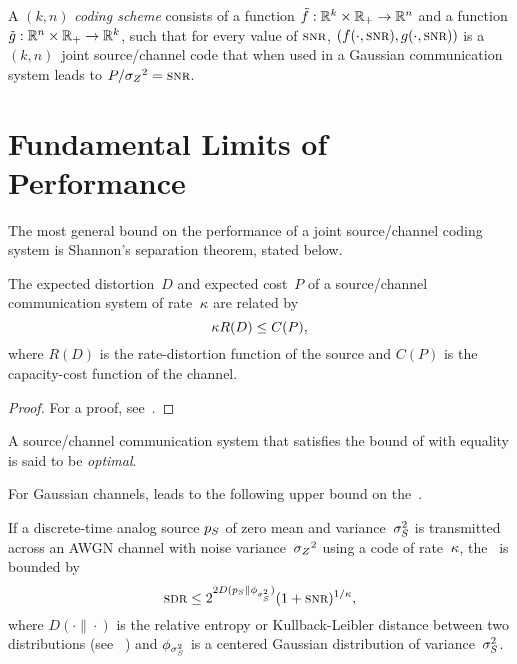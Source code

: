\begin{definition}
  \label{def:codingscheme}
  A $(k,n)$ \emph{coding scheme} consists of a function $\tilde{f} : \mathbb{R}^k \times
  \mathbb{R}_+ \rightarrow \mathbb{R}^n$ and a function $\tilde{g}: \mathbb{R}^n \times \mathbb{R}_+ \rightarrow \mathbb{R}^k$, such
  that for every value of $\snr$, $(f(\cdot, \snr), g(\cdot, \snr))$ is a
  $(k,n)$~joint source/channel code that when used in a Gaussian communication
  system leads to $P/\szq = \snr$.
\end{definition}


\section{Fundamental Limits of Performance}
\label{sec:limits}

The most general bound on the performance of a joint source/channel coding
system is Shannon's separation theorem, stated below.

\begin{theorem}
  \label{thm:sepconverse}
  The expected distortion~$D$ and expected cost~$P$ of a source/channel
  communication system of rate~$\kappa$ are related by
  \begin{equation}
    \label{eq:sepconverse}
    \kappa R(D) \le C(P), 
  \end{equation}
  where $R(D)$ is the rate-distortion function of the source and $C(P)$ is the
  capacity-cost function of the channel.
\end{theorem}

\begin{proof}
  For a proof, see~\cite[Theorem~9.6.1]{Gallager1968}.
\end{proof}

\begin{definition}
  \label{def:optimalcode}
  A source/channel communication system that satisfies the bound of
   with equality is said to be \emph{optimal}.
\end{definition}

For Gaussian channels,  leads to the following upper bound
on the~\sdr.
\begin{theorem}
  \label{thm:sdrub}
  If a discrete-time analog source ${p_S}$ of zero mean and variance~${\sigma_S^2}$ is
  transmitted across an AWGN channel with noise variance~${{\sigma_Z}^2}$ using a code of
  rate~$\kappa$, the \sdr\ is bounded by
  \begin{equation}
    \label{eq:sdrub}
    \sdr \le 2^{2 D(\pS \| \phi_{\ssq})} (1 + \snr)^{1/\k},
  \end{equation}
  where $D(\cdot \| \cdot)$ is the relative entropy or Kullback-Leibler distance
  between two distributions (see \eg~\cite{CoverT1991}) and $\phi_{{\sigma_S^2}}$ is a
  centered Gaussian distribution of variance~${\sigma_S^2}$.
\end{theorem}

